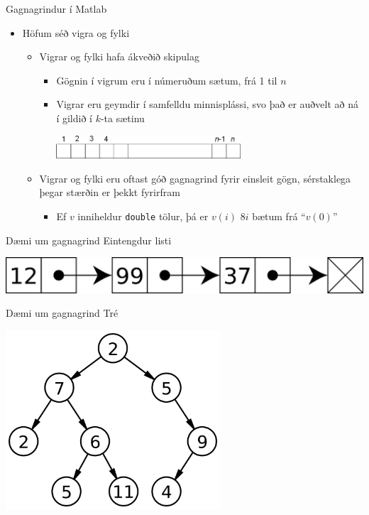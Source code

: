 \documentclass[handout]{beamer}
\begin{document}
\begin{frame}{Gagnagrindur í Matlab}
\begin{itemize}
 \item Höfum séð vigra og fylki
 \begin{itemize}
  \item Vigrar og fylki hafa ákveðið skipulag
  \begin{itemize}
   \item Gögnin í vigrum eru í númeruðum sætum, frá 1 til $n$
   \item Vigrar eru geymdir í samfelldu minnisplássi, svo það er auðvelt að ná í gildið í $k$-ta sætinu
\begin{center}
\includegraphics[width=0.6\textwidth]{../Pics/vector-index}
\end{center}
   \end{itemize}
  \item Vigrar og fylki eru oftast góð gagnagrind fyrir einsleit gögn, sérstaklega þegar stærðin er þekkt fyrirfram
  \begin{itemize}
   \item Ef $v$ inniheldur \texttt{double} tölur, þá er $v(i)$ $8i$ bætum frá ``$v(0)$''
  \end{itemize}
 \end{itemize}
\end{itemize}
\end{frame}

\begin{frame}{Dæmi um gagnagrind}
Eintengdur listi
\begin{center}
\includegraphics[width=\textwidth]{../Pics/singly-linked-list}
\end{center}
\end{frame}

\begin{frame}{Dæmi um gagnagrind}
\vspace{\baselineskip}
Tré
\begin{center}
\includegraphics[width=0.6\textwidth]{../Pics/tree}
\end{center}
\end{frame}
\end{document}
